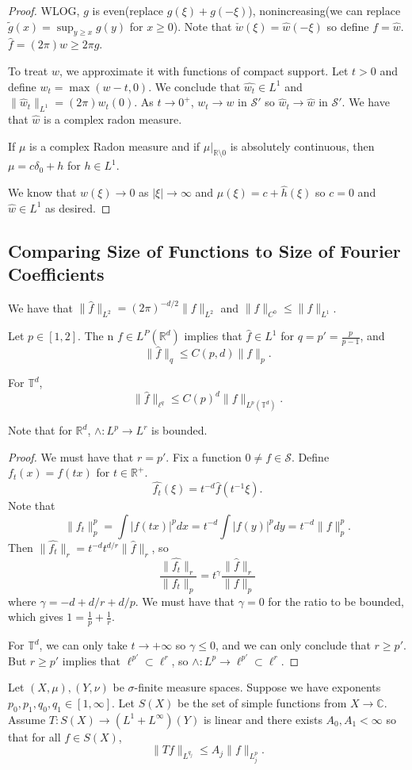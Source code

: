 \documentclass[11pt]{scrartcl}
\newcommand{\R}{\mathbb{R}}
\newcommand{\C}{\mathbb C}
\newcommand{\T}{\mathbb T}
\newcommand{\SRS}{\mathscr {S}}
\let \hat \widehat
\newcommand{\<}{\langle}
\renewcommand{\>}{\rangle}
\begin{document}
\begin{proof}
WLOG, $g$ is even(replace $g(\xi) + g(-\xi)$), nonincreasing(we can replace $\tilde{g}(x) = \sup_{y \ge x} g(y)$ for $x \ge 0$).  
Note that $\check{w}(\xi) = \hat{w}(-\xi)$ so define $f = \hat{w}$.  $\hat{f} = (2\pi) w \ge 2 \pi g$.

To treat $w$, we approximate it with functions of compact support.  Let $t > 0$ and define $w_t = \max(w - t, 0).$  We conclude that $\hat{w_t} \in L^1$ and $\|\hat{w}_t\|_{L^1} = (2\pi) w_t(0)$.  As $t \rightarrow 0^+$, $w_t \rightarrow w$ in $\SRS'$ so $\hat{w}_t \rightarrow \hat{w}$ in $\SRS'$.  We have that $\hat{w}$ is a complex radon measure.
\begin{fact} If $\mu$ is a complex Radon measure and if $\mu\vert_{\R\setminus 0}$ is absolutely continuous, then $\mu = c \delta_0 + h$ for $h \in L^1$.
\end{fact}

We know that $w(\xi) \rightarrow 0$ as $|\xi| \rightarrow \infty$ and $\hat{\mu}(\xi) = c + \hat{h}(\xi) $ so $c = 0$ and $\hat{w} \in L^1$ as desired.
\end{proof}

\subsection{Comparing Size of Functions to Size of Fourier Coefficients}
We have that $\|\hat f\|_{L^2} = (2\pi)^{-d/2}\|f\|_{L^2}$ and $\|\hat{f} \|_{C^0} \le \|f\|_{L^1}$.  

\begin{thm} Let $p \in [1, 2]$.  The n $f \in L^P(\R^d)$ implies that $\hat{f} \in L^1$ for $q = 
p' = \frac{p}{p-1}$, and $$\|\hat{f}\|_{q} \le C(p, d)\|f\|_p.$$

For $\T^d$, $$\|\hat{f}\|_{\ell^q} \le C(p)^d \|f\|_{L^p(\T^d)}.$$
\end{thm}
Note that for $\R^d$, $\wedge: L^p \rightarrow L^r$ is bounded. 
\begin{proof}
We must have that $r = p'$.  Fix a function $0 \ne f \in \SRS$.  Define $f_t(x) = f(tx)$ for $t \in \R^+$.  
$$\hat{f_t}(\xi) = t^{-d}\hat{f}(t^{-1}\xi).$$
Note that
$$\|f_t\|_p^p = \int |f(tx)|^p dx = t^{-d} \int |f(y)|^p dy = t^{-d}\|f\|_p^p.$$
Then $\|\hat{f_t}\|_r = t^{-d} t^{d/r} \|\hat{f}\|_r$, so 
$$\frac{\|\hat{f_t}\|_r }{\|f_t\|_p} = t^{\gamma} \frac{\|\hat{f}\|_r }{\|f\|_p}$$
where $\gamma = -d + d/r + d/p$.  We must have that $\gamma = 0$ for the ratio to be bounded, which gives $1 = \frac{1}{p} + \frac{1}{r}$.

For $\T^d$, we can only take $t \rightarrow + \infty$ so $\gamma \le 0$, and we can only conclude that $r \ge p'$.  But $r \ge p'$ implies that $\ell^{p'} \subset \ell^r$, so $\wedge: L^p \rightarrow \ell^{p'} \subset \ell^r$.
\end{proof}
\begin{thm} Let $(X, \mu), (Y, \nu)$ be $\sigma$-finite measure spaces.  Suppose we have exponents $p_0, p_1, q_0, q_1 \in [1, \infty]$.  Let $S(X)$ be the set of simple functions from $X \rightarrow \C$.  Assume $T: S(X) \rightarrow (L^1 + L^{\infty})(Y)$ is linear and there exists $A_0, A_1 < \infty$ so that for all $f \in S(X)$, $$\|Tf\|_{L^{q_j}} \le A_j\|f\|_{L^p_j}.$$
\end{thm}
\pagebreak
\end{document}
